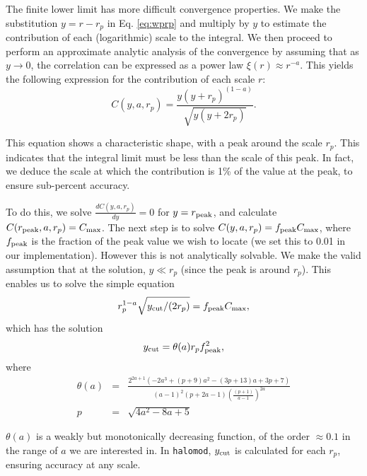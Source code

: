 \documentclass[5p]{elsarticle}
\begin{document}
The finite lower limit has more difficult convergence properties. We make the substitution $y=r-r_p$ in Eq. \ref{eq:wprp} and multiply by $y$ to estimate the contribution of each (logarithmic) scale to the integral. We then proceed to perform an approximate analytic analysis of the convergence by assuming that as $y \rightarrow 0$, the correlation can be expressed as a power law $\xi(r) \approx r^{-a}$. This yields the following expression for the contribution of each scale $r$:
 \begin{equation}
 	\label{eq:projcorrcontr}
 	C(y,a,r_p) = \frac{y(y+r_p)^{(1-a)}}{\sqrt{y(y+2r_p)}}.
 \end{equation} 

This equation shows a characteristic shape, with a peak around the scale $r_p$. 
This indicates that the integral limit must be less than the scale of this peak.
In fact, we deduce the scale at which the contribution is 1\% of the value at the peak, to ensure sub-percent accuracy.

To do this, we solve $\frac{d C(y,a,r_p)}{dy} = 0$ for $y=r_{\rm peak}$, and calculate $C(r_{\rm peak},a,r_p) = C_{\rm max}$. The next step is to solve $C(y,a,r_p) = f_{\rm peak}C_{\rm max}$, where $f_{\rm peak}$ is the fraction of the peak value we wish to locate (we set this to 0.01 in our implementation). However this is not analytically solvable. We make the valid assumption that at the solution, $y \ll r_p$ (since the peak is around $r_p$). 
This enables us to solve the simple equation 
\begin{equation}
	\label{eq:projcorrsolve}
	r_p^{1-a}\sqrt{y_{\rm cut}/(2r_p)} = f_{\rm peak}C_{\rm max},
\end{equation}
which has the solution
\begin{equation}
	\label{eq:projcorrsolution}
	y_{\rm cut} = \theta(a)r_pf_{\rm peak}^2,
\end{equation}
where
\begin{eqnarray}
	\label{eq:theta}
	\theta(a) &=& \frac{2^{2 a+1} \left(-2 a^3+\left(p+9\right) a^2-\left(3p+13\right) a+3p+7\right)}{(a-1)^2 \left(p+2 a-1\right)\left(\frac{\left(p+1\right)}{a-1}\right)^{2 a}} \\
	p &=& \sqrt{4 a^2-8 a+5}
\end{eqnarray}

$\theta(a)$ is a weakly but monotonically decreasing function, of the order $\approx 0.1$ in the range of $a$ we are interested in. In \verb|halomod|, $y_{\rm cut}$ is calculated for each $r_p$, ensuring accuracy at any scale.
\end{document}
